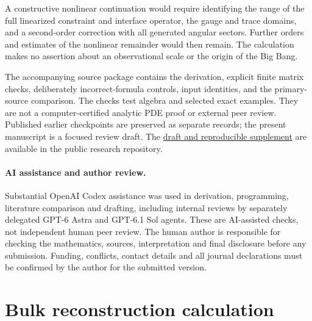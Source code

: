 \documentclass[11pt]{article}
\theoremstyle{remark}
\begin{document}
A constructive nonlinear continuation would require identifying the range
of the full linearized constraint and interface operator, the gauge and trace domains,
and a second-order correction with all generated angular sectors. Further
orders and estimates of the nonlinear remainder would then remain. The
calculation makes no assertion about an observational scale or the origin
of the Big Bang.

The accompanying source package contains the derivation, explicit finite
matrix checks, deliberately incorrect-formula controls, input identities,
and the primary-source comparison. The checks test algebra and selected
exact examples. They are not a computer-certified analytic PDE proof or
external peer review. Published earlier checkpoints are preserved as
separate records; the present manuscript is a focused review draft.
The \href{https://github.com/maldonado-research/HDblast/tree/main/research/HDBLAST_ROTATIONAL_OBSTRUCTION_PAPER_20261015}{draft and reproducible supplement}
are available in the public research repository.

\paragraph{AI assistance and author review.}
Substantial OpenAI Codex assistance was used in derivation, programming,
literature comparison and drafting, including internal reviews by separately
delegated GPT-6 Astra and GPT-6.1 Sol agents. These are AI-assisted checks,
not independent human peer review. The human author is responsible for
checking the mathematics, sources, interpretation and final disclosure
before any submission. Funding, conflicts, contact details and all journal
declarations must be confirmed by the author for the submitted version.

\appendix
\section{Bulk reconstruction calculation}
\label{app:reconstruction}
\end{document}

